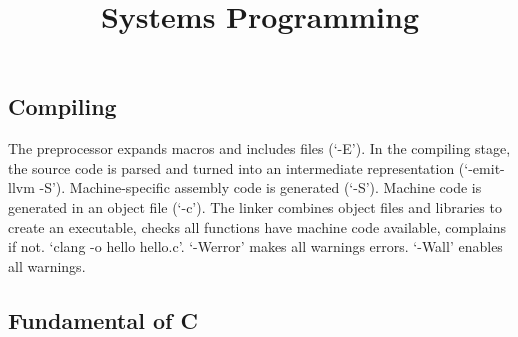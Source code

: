 \documentclass{article}
\title{Systems Programming}
\author{}
\date{}
\begin{document}
\small

\subsection*{Compiling}

The preprocessor expands macros and includes files (`-E').
In the compiling stage, the source code is parsed and turned into an intermediate representation (`-emit-llvm -S').
Machine-specific assembly code is generated (`-S'). 
Machine code is generated in an object file (`-c').
The linker combines object files and libraries to create an executable,
checks all functions have machine code available, complains if not.
`clang -o hello hello.c'.
`-Werror' makes all warnings errors.
`-Wall' enables all warnings.

\subsection*{Fundamental of C}
\end{document}
